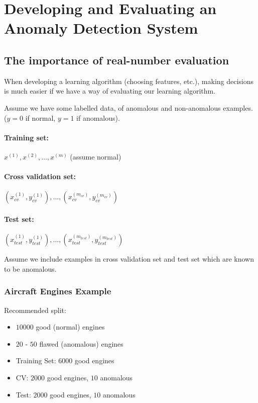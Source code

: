 \section{Developing and Evaluating an Anomaly Detection System}
\subsection{The importance of real-number evaluation}
When developing a learning algorithm (choosing features, etc.),
making decisions is much easier if we have a way of evaluating
our learning algorithm.

Assume we have some labelled data, of anomalous and non-anomalous
examples. ($y = 0$ if normal, $y=1$ if anomalous).

\paragraph{Training set:} $x^{(1)}, x^{(2)}, \dots, x^{(m)}$
(assume normal)

\paragraph{Cross validation set:} $(x_{cv}^{(1)}, y_{cv}^{(1)}), \dots,
    (x_{cv}^{(m_{cv})}, y_{cv}^{(m_{cv})})$

\paragraph{Test set:} $(x_{test}^{(1)}, y_{test}^{(1)}), \dots,
    (x_{test}^{(m_{test})}, y_{test}^{(m_{test})})$

Assume we include examples in cross validation set and test set which
are known to be anomalous.

\subsubsection{Aircraft Engines Example}
Recommended split:
\begin{itemize}
    \item $10000$ good (normal) engines
    \item $20$ - $50$ flawed (anomalous) engines
    \item Training Set: $6000$ good engines
    \item CV: $2000$ good engines, $10$ anomalous
    \item Test: $2000$ good engines, $10$ anomalous
\end{itemize}

